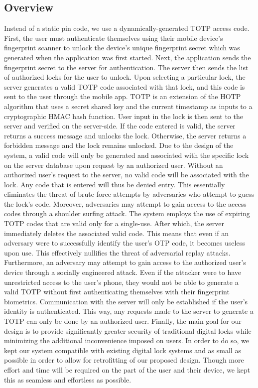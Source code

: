 \documentclass[conference]{IEEEtran}
\begin{document}
\subsection{Overview}
	Instead of a static pin code, we use a dynamically-generated TOTP access code. First, the user must authenticate themselves using their mobile device’s fingerprint scanner to unlock the device’s unique fingerprint secret which was generated when the application was first started. Next, the application sends the fingerprint secret to the server for authentication. The server then sends the list of authorized locks for the user to unlock. Upon selecting a particular lock, the server generates a valid TOTP code associated with that lock, and this code is sent to the user through the mobile app. TOTP is an extension of the HOTP algorithm that uses a secret shared key and the current timestamp as inputs to a cryptographic HMAC hash function. User input in the lock is then sent to the server and verified on the server-side. If the code entered is valid, the server returns a success message and unlocks the lock. Otherwise, the server returns a forbidden message and the lock remains unlocked.
	Due to the design of the system, a valid code will only be generated and associated with the specific lock on the server database upon request by an authorized user. Without an authorized user’s request to the server, no valid code will be associated with the lock. Any code that is entered will thus be denied entry. This essentially eliminates the threat of brute-force attempts by adversaries who attempt to guess the lock’s code. 
Moreover, adversaries may attempt to gain access to the access codes through a shoulder surfing attack. The system employs the use of expiring TOTP codes that are valid only for a single-use. After which, the server immediately deletes the associated valid code. This means that even if an adversary were to successfully identify the user’s OTP code, it becomes useless upon use. This effectively nullifies the threat of adversarial replay attacks.
	Furthermore, an adversary may attempt to gain access to the authorized user’s device through a socially engineered attack. Even if the attacker were to have unrestricted access to the user’s phone, they would not be able to generate a valid TOTP without first authenticating themselves with their fingerprint biometrics. Communication with the server will only be established if the user’s identity is authenticated. This way, any requests made to the server to generate a TOTP can only be done by an authorized user.
	Finally, the main goal for our design is to provide significantly greater security of traditional digital locks while minimizing the additional inconvenience imposed on users. In order to do so, we kept our system compatible with existing digital lock systems and as small as possible in order to allow for retrofitting of our proposed design. Though more effort and time will be required on the part of the user and their device, we kept this as seamless and effortless as possible. 
\end{document}
